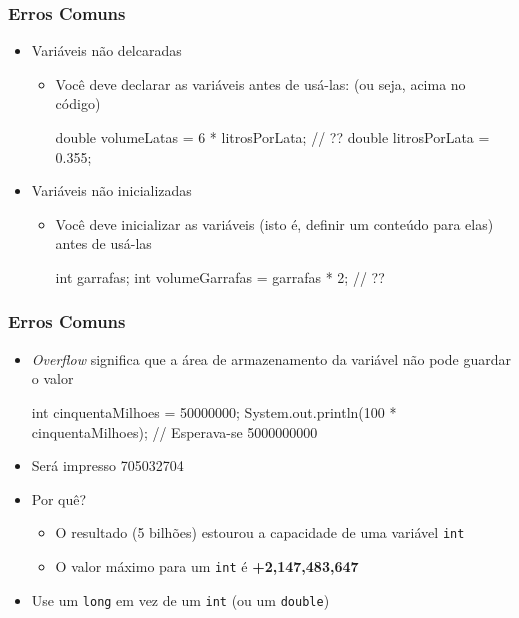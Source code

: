 \documentclass[xcolor={dvipsnames,table},aspectratio=169]{beamer}
\begin{document}
\begin{frame}[fragile]\frametitle{Erros Comuns}
\begin{itemize}
	\item Variáveis não delcaradas
	\begin{itemize}
		\item Você deve declarar as variáveis antes de usá-las: (ou seja, acima no código)
\begin{javacode}
double volumeLatas = 6 * litrosPorLata; // ??
double litrosPorLata = 0.355;
\end{javacode}
	\end{itemize}
	\item Variáveis não inicializadas
	\begin{itemize}
		\item Você deve inicializar as variáveis (isto é, definir um conteúdo para elas) antes de usá-las
\begin{javacode}
int garrafas;
int volumeGarrafas = garrafas * 2; // ??
\end{javacode}
	\end{itemize}
\end{itemize}
\end{frame}

\begin{frame}[fragile]\frametitle{Erros Comuns}
\begin{itemize}
	\item \emph{Overflow} significa que a área de armazenamento da variável não pode guardar o valor
\begin{javacode}
int cinquentaMilhoes = 50000000;
System.out.println(100 * cinquentaMilhoes);
// Esperava-se 5000000000
\end{javacode}
	\item Será impresso 705032704
	\item Por quê?
	\begin{itemize}
		\item O resultado (5 bilhões) estourou a capacidade de uma variável \texttt{int}
		\item O valor máximo para um \texttt{int} é \textbf{+2,147,483,647}
	\end{itemize}
	\item Use um \texttt{long} em vez de um \texttt{int} (ou um \texttt{double})
\end{itemize}
\end{frame}
\end{document}
